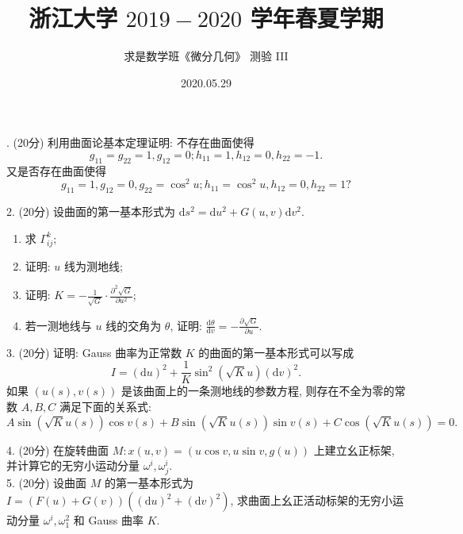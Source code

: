 \documentclass[UTF8]{ctexart}
\title{\LARGE \textbf{浙江大学 $2019-2020$ 学年春夏学期}}
\author{求是数学班《微分几何》 测验 III}
\date{2020.05.29}
\renewcommand{\d}{\text{d}}
\begin{document}
. (20分) 利用曲面论基本定理证明: 不存在曲面使得
\[
g_{11}=g_{22}=1,  g_{12}=0;   h_{11}=1,  h_{12}=0,  h_{22}=-1.
\]
又是否存在曲面使得
\[
g_{11}=1, g_{12}=0, g_{22}=\cos^2u; h_{11}=\cos^2u, h_{12}=0, h_{22}=1 ?
\]


2. (20分) 设曲面的第一基本形式为 $\d s^2=\d u^2+G(u,v)\d v^2$.
\begin{enumerate}[(1)]
    \item 求 $\Gamma_{ij}^{k}$;
    \item 证明: $u$ 线为测地线;
    \item 证明: $\displaystyle K=-\frac{1}{\sqrt{G}}\cdot\frac{\partial^2\sqrt{G}}{\partial u^2}$;
    \item 若一测地线与 $u$ 线的交角为 $\theta$, 证明: $\displaystyle \frac{\d \theta}{\d v}=-\frac{\partial\sqrt{G}}{\partial u}$.\\
\end{enumerate} 

3. (20分) 证明: Gauss 曲率为正常数 $K$ 的曲面的第一基本形式可以写成 
\[ 
I=(\d u)^2+\frac{1}{K}\sin^2(\sqrt{K}u)(\d v)^2.
\]
如果 $(u(s),v(s))$ 是该曲面上的一条测地线的参数方程, 则存在不全为零的常数 $A,B,C$ 满足下面的关系式:
\[
A\sin\left(\sqrt{K}u(s)\right)\cos v(s)+B\sin\left(\sqrt{K}u(s)\right)\sin v(s)+C\cos\left(\sqrt{K}u(s)\right)=0.    
\]


4. (20分) 在旋转曲面 $M:x(u,v)=(u\cos v,u\sin v,g(u))$ 上建立幺正标架, 并计算它的无穷小运动分量 $\omega^i,\omega_j^i$.
\\

5. (20分) 设曲面 $M$ 的第一基本形式为 $I=\left(F(u)+G(v)\right)\left((\d u)^2+(\d v)^2\right)$, 
求曲面上幺正活动标架的无穷小运动分量 $\omega^i,\omega_1^2$ 和 Gauss 曲率 $K$.
\end{document}
